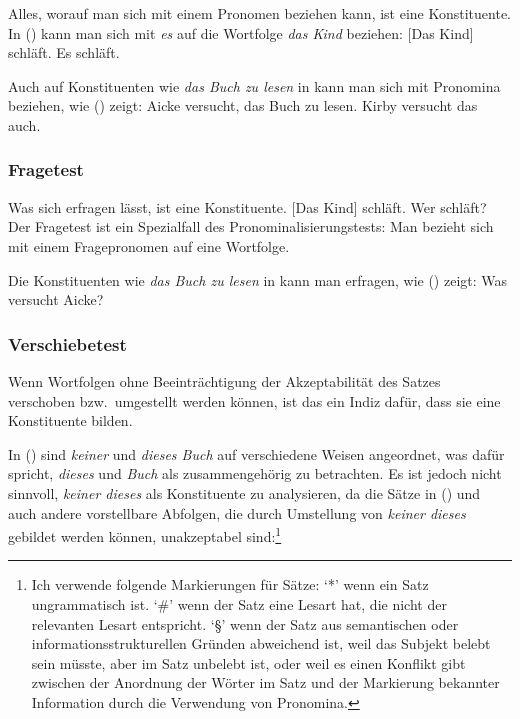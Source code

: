 Alles,
worauf man sich mit einem Pronomen beziehen kann, ist eine Konstituente. 
In () kann man sich \zb mit \emph{es} auf die Wortfolge \emph{das Kind} beziehen:
\eal
\ex {}[Das Kind] schläft.
\ex Es schläft.
\zl

\noindent
Auch auf Konstituenten wie \emph{das Buch zu lesen} in 
kann man sich mit Pronomina beziehen, wie () zeigt:
\eal
\ex Aicke versucht, das Buch zu lesen.
\ex Kirby versucht das auch.
\zl


\subsubsection{Fragetest}

Was sich erfragen lässt, ist eine Konstituente.
        \eal
        \ex {}[Das Kind] schläft.
        \ex Wer schläft?
        \zl
        Der Fragetest ist ein Spezialfall des Pronominalisierungstests: Man bezieht sich mit
        einem Fragepronomen auf eine Wortfolge.

Die Konstituenten wie \emph{das Buch zu lesen} in  kann man erfragen,
wie () zeigt:
\ea
Was versucht Aicke?
\z

\subsubsection{Verschiebetest}

Wenn Wortfolgen ohne Beeinträchtigung der Akzeptabilität des Satzes verschoben
bzw.\ umgestellt werden können, ist das ein Indiz dafür, dass sie eine Konstituente bilden.

        In () sind \emph{keiner} und \emph{dieses Buch} auf verschiedene Weisen angeordnet,
        was dafür spricht, \emph{dieses} und \emph{Buch} als zusammengehörig zu betrachten.
        \eal
        \zl
Es ist jedoch nicht sinnvoll, \emph{keiner dieses} als Konstituente zu analysieren,
da die Sätze in () und auch andere vorstellbare Abfolgen, die durch
Umstellung von \emph{keiner dieses} gebildet werden können, unakzeptabel sind:\footnote{
  Ich verwende folgende Markierungen für Sätze: `*'\is{*} wenn ein Satz ungrammatisch ist.
  `\#'\is{\#} wenn der Satz eine Lesart hat, die nicht der relevanten Lesart entspricht.
  `\S'\is{\S} wenn der Satz aus semantischen oder informationsstrukturellen Gründen abweichend ist,
  \zb weil das Subjekt belebt sein müsste, aber im Satz unbelebt ist, oder weil es einen
  Konflikt gibt zwischen der Anordnung der Wörter im Satz und der Markierung bekannter
  Information durch die Verwendung von Pronomina.%
}
\eal
{}
\zl

